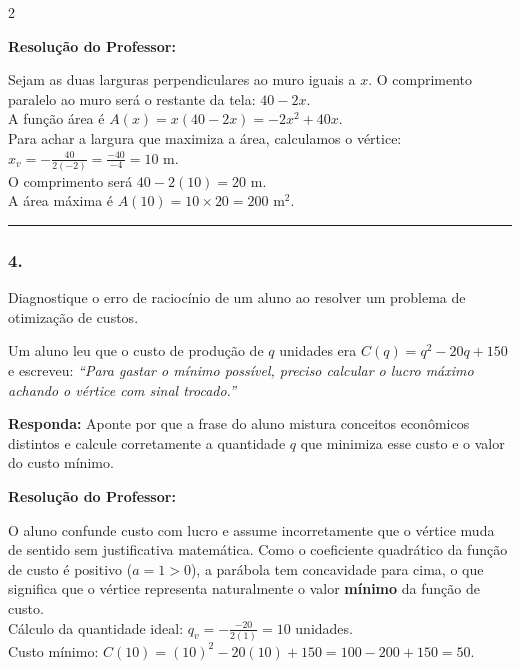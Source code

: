 \begin{multicols*}{2}
\ifgabarito
    \begin{tcolorbox}[colback=CorTitUm!5, colframe=CorTitUm, boxrule=1pt, arc=4pt, left=6pt, right=6pt, top=6pt, bottom=6pt]
    \small\textbf{\textcolor{CorTitUm}{Resolução do Professor:}}\par\vspace{0.1cm}
    \color{CinzaEscuro}
    Sejam as duas larguras perpendiculares ao muro iguais a $x$. O comprimento paralelo ao muro será o restante da tela: $40 - 2x$. \\
    A função área é $A(x) = x(40 - 2x) = -2x^2 + 40x$. \\
    Para achar a largura que maximiza a área, calculamos o vértice: $x_v = -\frac{40}{2(-2)} = \frac{-40}{-4} = 10\text{ m}$. \\
    O comprimento será $40 - 2(10) = 20\text{ m}$. \\
    A área máxima é $A(10) = 10 \times 20 = 200\text{ m}^2$.
    \end{tcolorbox}
\fi

\par\vspace{\espacoQuestao}

\noindent\textcolor{CorLinha}{\rule{\linewidth}{0.5pt}} 
\par\vspace{\espacoPreQuestao}
\subsubsection*{4.} Diagnostique o erro de raciocínio de um aluno ao resolver um problema de otimização de custos.

Um aluno leu que o custo de produção de $q$ unidades era $C(q) = q^2 - 20q + 150$ e escreveu: \textit{``Para gastar o mínimo possível, preciso calcular o lucro máximo achando o vértice com sinal trocado.''}
\begin{boxresponda}
\textbf{Responda:} Aponte por que a frase do aluno mistura conceitos econômicos distintos e calcule corretamente a quantidade $q$ que minimiza esse custo e o valor do custo mínimo.
\end{boxresponda}

\ifgabarito
    \begin{tcolorbox}[colback=CorTitUm!5, colframe=CorTitUm, boxrule=1pt, arc=4pt, left=6pt, right=6pt, top=6pt, bottom=6pt]
    \small\textbf{\textcolor{CorTitUm}{Resolução do Professor:}}\par\vspace{0.1cm}
    \color{CinzaEscuro}
    O aluno confunde custo com lucro e assume incorretamente que o vértice muda de sentido sem justificativa matemática. Como o coeficiente quadrático da função de custo é positivo ($a = 1 > 0$), a parábola tem concavidade para cima, o que significa que o vértice representa naturalmente o valor \textbf{mínimo} da função de custo. \\
    Cálculo da quantidade ideal: $q_v = -\frac{-20}{2(1)} = 10$ unidades. \\
    Custo mínimo: $C(10) = (10)^2 - 20(10) + 150 = 100 - 200 + 150 = 50$.
    \end{tcolorbox}
\fi


\end{multicols*}
